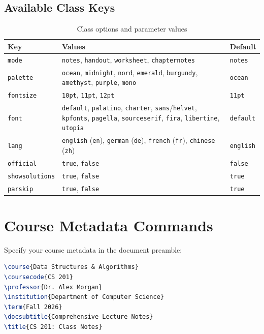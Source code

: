 \documentclass[mode=notes, palette=ocean, fontsize=11pt]{modernclassnotes}
\begin{document}
\subsection{Available Class Keys}
\begin{table}[h]
\centering
\begin{tabular}{l|p{9.5cm}|l}
\toprule
\textbf{Key} & \textbf{Values} & \textbf{Default} \\
\midrule
\texttt{mode} & \texttt{notes}, \texttt{handout}, \texttt{worksheet}, \texttt{chapternotes} & \texttt{notes} \\ \hline
\texttt{palette} & \texttt{ocean}, \texttt{midnight}, \texttt{nord}, \texttt{emerald}, \texttt{burgundy}, \texttt{amethyst}, \texttt{purple}, \texttt{mono} & \texttt{ocean} \\ \hline
\texttt{fontsize} & \texttt{10pt}, \texttt{11pt}, \texttt{12pt} & \texttt{11pt} \\ \hline
\texttt{font} & \texttt{default}, \texttt{palatino}, \texttt{charter}, \texttt{sans}/\texttt{helvet}, \texttt{kpfonts}, \texttt{pagella}, \texttt{sourceserif}, \texttt{fira}, \texttt{libertine}, \texttt{utopia} & \texttt{default} \\ \hline
\texttt{lang} & \texttt{english} (\texttt{en}), \texttt{german} (\texttt{de}), \texttt{french} (\texttt{fr}), \texttt{chinese} (\texttt{zh}) & \texttt{english} \\ \hline
\texttt{official} & \texttt{true}, \texttt{false} & \texttt{false} \\ \hline
\texttt{showsolutions} & \texttt{true}, \texttt{false} & \texttt{true} \\ \hline
\texttt{parskip} & \texttt{true}, \texttt{false} & \texttt{true} \\
\bottomrule
\end{tabular}
\caption{Class options and parameter values}
\end{table}

\section{Course Metadata Commands}

Specify your course metadata in the document preamble:
\begin{codebox}
\begin{lstlisting}[language=TeX]
\course{Data Structures & Algorithms}
\coursecode{CS 201}
\professor{Dr. Alex Morgan}
\institution{Department of Computer Science}
\term{Fall 2026}
\docsubtitle{Comprehensive Lecture Notes}
\title{CS 201: Class Notes}
\end{lstlisting}
\end{codebox}
\end{document}
